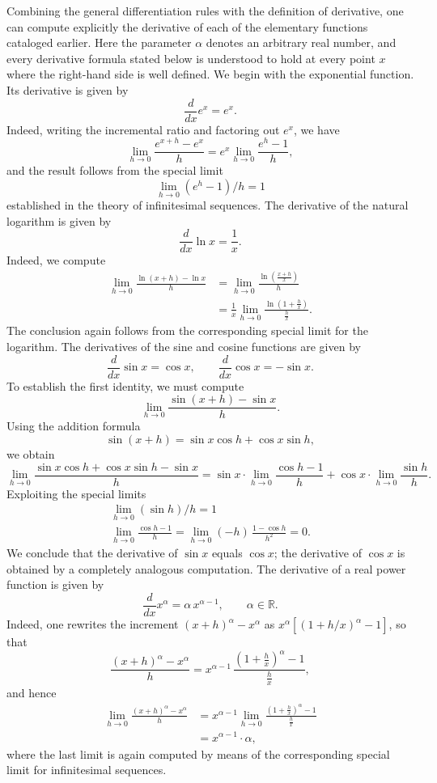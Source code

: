 Combining the general differentiation rules with the definition of derivative, one can compute explicitly the derivative of each of the elementary functions cataloged earlier. Here the parameter $\alpha$ denotes an arbitrary real number, and every derivative formula stated below is understood to hold at every point $x$ where the right-hand side is well defined. We begin with the exponential function. Its derivative is given by
\[
\frac{d}{dx} e^x = e^x.
\]
Indeed, writing the incremental ratio and factoring out $e^x$, we have \[
\lim_{h \to 0} \frac{e^{x+h} - e^x}{h} = e^x \lim_{h \to 0} \frac{e^h - 1}{h},
\] and the result follows from the special limit \[
\lim_{h \to 0} (e^h - 1)/h = 1
\] established in the theory of infinitesimal sequences. The derivative of the natural logarithm is given by
\[
\frac{d}{dx} \ln x = \frac{1}{x}.
\]
Indeed, we compute
\[
\begin{aligned}
\lim_{h \to 0} \frac{\ln(x+h) - \ln x}{h} &= \lim_{h \to 0} \frac{\ln\!\left( \frac{x+h}{x} \right)}{h} \\
&= \frac{1}{x} \lim_{h \to 0} \frac{\ln\!\left(1 + \frac{h}{x}\right)}{\frac{h}{x}}.
\end{aligned}
\]
The conclusion again follows from the corresponding special limit for the logarithm. The derivatives of the sine and cosine functions are given by
\[
\frac{d}{dx} \sin x = \cos x, \qquad \frac{d}{dx} \cos x = -\sin x.
\]
To establish the first identity, we must compute
\[
\lim_{h \to 0} \frac{\sin(x+h) - \sin x}{h}.
\]
Using the addition formula
\[
\sin(x+h) = \sin x \cos h + \cos x \sin h,
\] we obtain
\[
\lim_{h \to 0} \frac{\sin x \cos h + \cos x \sin h - \sin x}{h} = \sin x \cdot \lim_{h \to 0} \frac{\cos h - 1}{h} + \cos x \cdot \lim_{h \to 0} \frac{\sin h}{h}.
\]
Exploiting the special limits
\[
\begin{gathered}
\lim_{h \to 0} (\sin h)/h = 1 \\
\lim_{h \to 0} \frac{\cos h - 1}{h} = \lim_{h \to 0} (-h) \, \frac{1 - \cos h}{h^2} = 0.
\end{gathered}
\]
We conclude that the derivative of $\sin x$ equals $\cos x$; the derivative of $\cos x$ is obtained by a completely analogous computation. The derivative of a real power function is given by
\[
\frac{d}{dx} x^\alpha = \alpha \, x^{\alpha - 1}, \qquad \alpha \in \mathbb{R}.
\]
Indeed, one rewrites the increment $(x+h)^\alpha - x^\alpha$ as $x^\alpha [ ( 1 + h/x )^\alpha - 1 ]$, so that
\[
\frac{(x+h)^\alpha - x^\alpha}{h} = x^{\alpha - 1} \, \frac{\left(1 + \frac{h}{x}\right)^\alpha - 1}{\frac{h}{x}},
\]
and hence
\[
\begin{aligned}
\lim_{h \to 0} \frac{(x+h)^\alpha - x^\alpha}{h} &= x^{\alpha - 1} \lim_{h \to 0} \frac{\left(1 + \frac{h}{x}\right)^\alpha - 1}{\frac{h}{x}} \\
&= x^{\alpha - 1} \cdot \alpha,
\end{aligned}
\]
where the last limit is again computed by means of the corresponding special limit for infinitesimal sequences.

